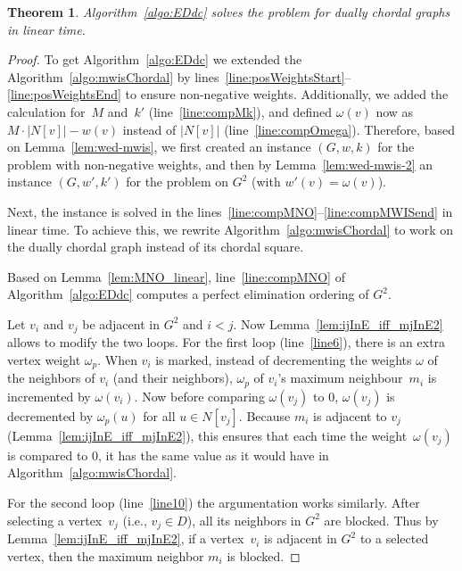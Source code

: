 \documentclass[]{elsarticle}
\newtheorem{theorem}{Theorem}[]
\def\mwis{{\sc{MWIS }}}
\def\minwed{{\sc{Min-WED }}}
\begin{document}
\begin{theorem}\label{thm:meed}
Algorithm~\ref{algo:EDdc} solves the \minwed problem for dually chordal graphs in linear time.
\end{theorem}

\begin{proof}

To get Algorithm~\ref{algo:EDdc} we extended the Algorithm~\ref{algo:mwisChordal} by lines~\ref{line:posWeightsStart}--\ref{line:posWeightsEnd} to ensure non-negative weights. 
Additionally, we added the calculation for~$M$ and~$k'$ (line~\ref{line:compMk}), and defined $\omega(v)$ now as $M \cdot |N[v]| - w(v)$ instead of $|N[v]|$ (line~\ref{line:compOmega}). 
Therefore, based on Lemma~\ref{lem:wed-mwis}, we first created an instance $(G,w,k)$ for the \minwed problem with non-negative weights, and then by Lemma~\ref{lem:wed-mwis-2} an instance $(G,w',k')$ for the \mwis problem on $G^2$ (with $w'(v)=\omega(v)$).

Next, the \mwis instance is solved in the lines~\ref{line:compMNO}--\ref{line:compMWISend} in linear time.
To achieve this, we rewrite Algorithm~\ref{algo:mwisChordal} to work on the dually chordal graph instead of its chordal square.

Based on Lemma~\ref{lem:MNO_linear}, line~\ref{line:compMNO} of Algorithm~\ref{algo:EDdc} computes a perfect elimination ordering of $G^2$.

Let $v_i$ and $v_j$ be adjacent in $G^2$ and $i <j$. Now Lemma~\ref{lem:ijInE_iff_mjInE2} allows to modify the two loops. 
For the first loop (line~\ref{line6}), there is an extra vertex weight $\omega_p$. 
When $v_i$ is marked, instead of decrementing the weights $\omega$ of the neighbors of $v_i$ (and their neighbors), $\omega_p$ of $v_i$'s maximum neighbour~$m_i$ is incremented by $\omega(v_i)$.
Now before comparing $\omega(v_j)$ to $0$, $\omega(v_j)$ is decremented by $\omega_p(u)$ for all $u \in N[v_j]$. 
Because $m_i$ is adjacent to $v_j$ (Lemma~\ref{lem:ijInE_iff_mjInE2}), this ensures that each time the weight~$\omega(v_j)$ is compared to $0$, it has the same value as it would have in Algorithm~\ref{algo:mwisChordal}.

For the second loop (line~\ref{line10}) the argumentation works similarly. 
After selecting a vertex~$v_j$ (i.e., $v_j \in D$), all its neighbors in $G^2$ are blocked. 
Thus by Lemma~\ref{lem:ijInE_iff_mjInE2}, if a vertex~$v_i$ is adjacent in $G^2$ to a selected vertex, then the maximum neighbor $m_i$ is blocked.


\end{proof}
\end{document}
